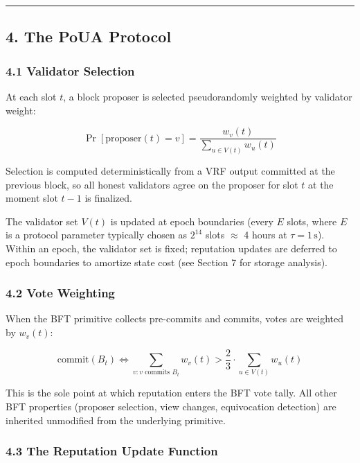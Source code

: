 \documentclass[
  11pt,
]{article}
\begin{document}
\begin{center}\rule{0.5\linewidth}{0.5pt}\end{center}

\subsection{4. The PoUA Protocol}\label{the-poua-protocol}

\subsubsection{4.1 Validator Selection}\label{validator-selection}

At each slot \(t\), a block proposer is selected pseudorandomly weighted
by validator weight:

\[\Pr[\text{proposer}(t) = v] = \frac{w_v(t)}{\sum_{u \in V(t)} w_u(t)}\]

Selection is computed deterministically from a VRF output committed at
the previous block, so all honest validators agree on the proposer for
slot \(t\) at the moment slot \(t-1\) is finalized.

The validator set \(V(t)\) is updated at epoch boundaries (every \(E\)
slots, where \(E\) is a protocol parameter typically chosen as
\(2^{14}\) slots \(\approx\) 4 hours at \(\tau = 1\,\text{s}\)). Within
an epoch, the validator set is fixed; reputation updates are deferred to
epoch boundaries to amortize state cost (see Section 7 for storage
analysis).

\subsubsection{4.2 Vote Weighting}\label{vote-weighting}

When the BFT primitive collects pre-commits and commits, votes are
weighted by \(w_v(t)\):

\[\text{commit}(B_t) \iff \sum_{v : v \text{ commits } B_t} w_v(t) > \frac{2}{3} \cdot \sum_{u \in V(t)} w_u(t)\]

This is the sole point at which reputation enters the BFT vote tally.
All other BFT properties (proposer selection, view changes, equivocation
detection) are inherited unmodified from the underlying primitive.

\subsubsection{4.3 The Reputation Update
Function}\label{the-reputation-update-function}
\end{document}
